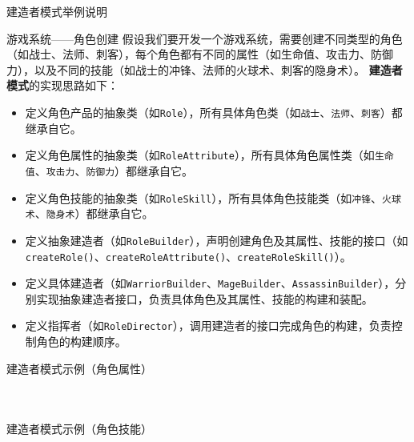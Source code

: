 \documentclass[UTF8,aspectratio=169]{beamer}
\begin{document}
\begin{frame}{建造者模式举例说明}
    \begin{exampleytublock}{游戏系统——角色创建}
        假设我们要开发一个游戏系统，需要创建不同类型的角色（如战士、法师、刺客），每个角色都有不同的属性（如生命值、攻击力、防御力），以及不同的技能（如战士的冲锋、法师的火球术、刺客的隐身术）。
        \textbf{建造者模式}的实现思路如下：
        \begin{itemize}
            \item 定义角色产品的抽象类（如\texttt{Role}），所有具体角色类（如\texttt{战士}、\texttt{法师}、\texttt{刺客}）都继承自它。
            \item 定义角色属性的抽象类（如\texttt{RoleAttribute}），所有具体角色属性类（如\texttt{生命值}、\texttt{攻击力}、\texttt{防御力}）都继承自它。
            \item 定义角色技能的抽象类（如\texttt{RoleSkill}），所有具体角色技能类（如\texttt{冲锋}、\texttt{火球术}、\texttt{隐身术}）都继承自它。
            \item 定义抽象建造者（如\texttt{RoleBuilder}），声明创建角色及其属性、技能的接口（如\texttt{createRole()}、\texttt{createRoleAttribute()}、\texttt{createRoleSkill()}）。
            \item 定义具体建造者（如\texttt{WarriorBuilder}、\texttt{MageBuilder}、\texttt{AssassinBuilder}），分别实现抽象建造者接口，负责具体角色及其属性、技能的构建和装配。
            \item 定义指挥者（如\texttt{RoleDirector}），调用建造者的接口完成角色的构建，负责控制角色的构建顺序。
        \end{itemize}
    \end{exampleytublock}
\end{frame}

\begin{frame}{建造者模式示例（角色属性）}
    \begin{columns}
        \begin{column}{0.48\textwidth}
            \inputminted[firstline=1, lastline=15]{cpp}{code/builder_pattern.cpp}
        \end{column}
        \begin{column}{0.48\textwidth}
            \inputminted[firstline=16, lastline=34]{cpp}{code/builder_pattern.cpp}
        \end{column}
    \end{columns}
\end{frame}

\begin{frame}{建造者模式示例（角色技能）}
    \begin{columns}
        \begin{column}{0.48\textwidth}
            \inputminted[firstline=36, lastline=49]{cpp}{code/builder_pattern.cpp}
        \end{column}
        \begin{column}{0.48\textwidth}
            \inputminted[firstline=50, lastline=61]{cpp}{code/builder_pattern.cpp}
        \end{column}
    \end{columns}
\end{frame}
\end{document}
